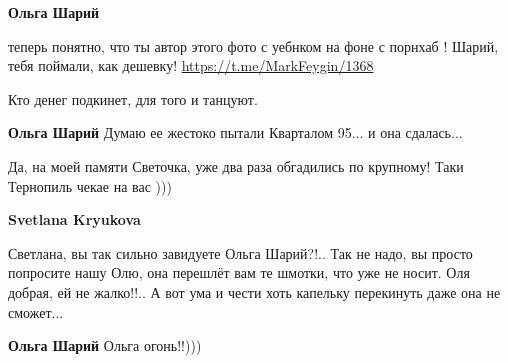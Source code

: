 \begin{itemize}
\begin{itemize}
 
\textbf{Ольга Шарий} 

теперь понятно, что ты автор этого фото с уебнком на фоне с порнхаб ! 
Шарий, тебя поймали, как дешевку! \url{https://t.me/MarkFeygin/1368}

 
Кто денег подкинет, для того и танцуют.

 
\textbf{Ольга Шарий} Думаю ее жестоко пытали Кварталом 95... и она сдалась...

 
Да, на моей памяти Светочка, уже два раза обгадились по крупному! Таки Тернопиль чекае на вас )))

 
\textbf{Svetlana Kryukova} 

Светлана, вы так сильно завидуете Ольга Шарий?!.. Так не надо, вы просто
попросите нашу Олю, она перешлёт вам те шмотки, что уже не носит. Оля добрая,
ей не жалко!!.. А вот ума и чести хоть капельку перекинуть даже она не
сможет...

 
\textbf{Ольга Шарий} Ольга огонь!!)))


\end{itemize}
\end{itemize}
